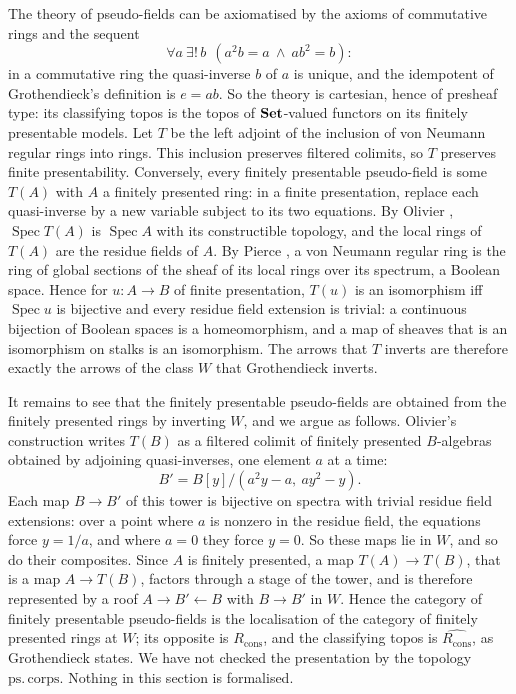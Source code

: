 The theory of pseudo-fields can be axiomatised by the axioms of commutative rings and the sequent
\[
\forall a\ \exists!\,b\ \ (a^2b = a\ \wedge\ ab^2 = b):
\]
in a commutative ring the quasi-inverse $b$ of $a$ is unique, and the idempotent of Grothendieck's definition is $e = ab$. So the theory is cartesian, hence of presheaf type: its classifying topos is the topos of $\mathbf{Set}$-valued functors on its finitely presentable models. Let $T$ be the left adjoint of the inclusion of von Neumann regular rings into rings. This inclusion preserves filtered colimits, so $T$ preserves finite presentability. Conversely, every finitely presentable pseudo-field is some $T(A)$ with $A$ a finitely presented ring: in a finite presentation, replace each quasi-inverse by a new variable subject to its two equations. By Olivier \cite{olivier}, $\operatorname{Spec}T(A)$ is $\operatorname{Spec}A$ with its constructible topology, and the local rings of $T(A)$ are the residue fields of $A$. By Pierce \cite{pierce}, a von Neumann regular ring is the ring of global sections of the sheaf of its local rings over its spectrum, a Boolean space. Hence for $u:A\to B$ of finite presentation, $T(u)$ is an isomorphism iff $\operatorname{Spec}u$ is bijective and every residue field extension is trivial: a continuous bijection of Boolean spaces is a homeomorphism, and a map of sheaves that is an isomorphism on stalks is an isomorphism. The arrows that $T$ inverts are therefore exactly the arrows of the class $W$ that Grothendieck inverts.

It remains to see that the finitely presentable pseudo-fields are obtained from the finitely presented rings by inverting $W$, and we argue as follows. Olivier's construction writes $T(B)$ as a filtered colimit of finitely presented $B$-algebras obtained by adjoining quasi-inverses, one element $a$ at a time:
\[
B' = B[y]/(a^2y - a,\ ay^2 - y).
\]
Each map $B\to B'$ of this tower is bijective on spectra with trivial residue field extensions: over a point where $a$ is nonzero in the residue field, the equations force $y = 1/a$, and where $a = 0$ they force $y = 0$. So these maps lie in $W$, and so do their composites. Since $A$ is finitely presented, a map $T(A)\to T(B)$, that is a map $A\to T(B)$, factors through a stage of the tower, and is therefore represented by a roof $A\to B'\leftarrow B$ with $B\to B'$ in $W$. Hence the category of finitely presentable pseudo-fields is the localisation of the category of finitely presented rings at $W$; its opposite is $R_{\mathrm{cons}}$, and the classifying topos is $\widehat{R_{\mathrm{cons}}}$, as Grothendieck states. We have not checked the presentation by the topology $\mathrm{ps.\,corps}$. Nothing in this section is formalised.

